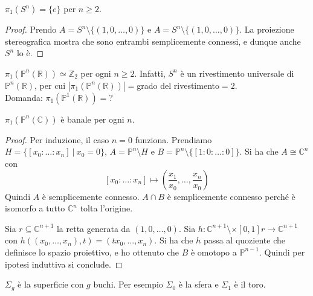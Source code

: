 \begin{ex}
    $\pi_1(S^n)=\{e\}$ per $n\geq 2$.
\end{ex}
\begin{proof}
    Prendo $A=S^n\setminus\{(1,0,\dots,0)\}$ e $A=S^n\setminus\{(1,0,\dots,0)\}$. La proiezione stereografica mostra che sono entrambi semplicemente connessi, e dunque anche $S^n$ lo \`e.
\end{proof}

\begin{oss}
  $\pi_1(\mathbb{P}^n(\mathbb{R})) \simeq \mathbb{Z}_2$ per ogni $n \ge 2$. Infatti, $S^n$ è un rivestimento universale di $\mathbb{P}^n(\mathbb{R})$, per cui $|\pi_1(\mathbb{P}^n(\mathbb{R}))|=$grado del rivestimento$=2$. \\
  Domanda: $\pi_1(\mathbb{P}^1(\mathbb{R}))=$?
\end{oss}

\begin{ex}
    $\pi_1(\mathbb{P}^n(\mathbb{C}))$ \`e banale per ogni $n$.
\end{ex}
\begin{proof}
    Per induzione, il caso $n=0$ funziona. Prendiamo $H = \{[x_0:\dots:x_n]\ | \ x_0=0\}$, $A = \mathbb{P}^n\setminus H$ e $B= \mathbb{P}^n\setminus \{[1:0:\dots:0]\}$. Si ha che $A\cong \mathbb{C}^n$ con
    \[
        [x_0:\dots:x_n]\mapsto(\frac{x_1}{x_0},\dots, \frac{x_n}{x_0})
    \]
    Quindi $A$ \`e semplicemente connesso.
    $A\cap B$ \`e semplicemente connesso perch\'e \`e isomorfo a tutto $\mathbb{C}^n$ tolta l'origine.

    Sia $r\subseteq\mathbb{C}^{n+1}$ la retta generata da $(1,0,\dots, 0)$.
    Sia $h\colon\mathbb{C}^{n+1}\setminus \times [0,1] r\longrightarrow \mathbb{C}^{n+1}$ con $h((x_0, \dots, x_n), t)=(tx_0, \dots, x_n)$.
    Si ha che $h$ passa al quoziente che definisce lo spazio proiettivo, e ho ottenuto che $B$ \`e omotopo a $\mathbb{P}^{n-1}$. Quindi per ipotesi induttiva si conclude.
\end{proof}

\begin{defn}
    $\Sigma_g$ \`e la superficie con $g$ buchi. Per esempio $\Sigma_0$ \`e la sfera e $\Sigma_1$ \`e il toro.
\end{defn}

